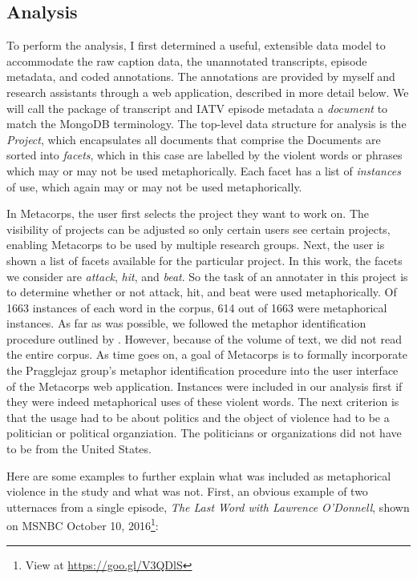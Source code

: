 \subsection{Analysis}
\label{sub:Analysis}

To perform the analysis, I first determined a useful, extensible data model to
accommodate the raw caption data, the unannotated transcripts, episode metadata,
and coded annotations. The annotations are provided by myself and research assistants
through a web application, described in more detail below. We will call the
package of transcript and IATV episode metadata a \textit{document} to match the 
MongoDB terminology. The top-level data structure for analysis is the \textit{Project},
which encapsulates all documents that comprise the 
Documents are sorted into \textit{facets}, which in this case are labelled by the 
violent words or phrases which may or may not be used metaphorically. Each 
facet has a list of \textit{instances} of use, which again may or may not be
used metaphorically. 

In Metacorps, the user first selects the project they want to work on. The
visibility of projects can be adjusted so only certain users see certain projects,
enabling Metacorps to be used by multiple research groups. Next, the user
is shown a list of facets available for the particular project. In this work,
the facets we consider are \textit{attack}, \textit{hit}, and \textit{beat}. 
So the task of an annotater in this project is to determine whether or not
attack, hit, and beat were used metaphorically. Of 1663 instances of each word
in the corpus, 614 out of 1663 were metaphorical instances. As far as was 
possible, we followed the metaphor identification procedure outlined by 
. However, because of the volume of text, we did not
read the entire corpus. As time goes on, a goal of Metacorps is to formally
incorporate the Pragglejaz group's metaphor identification procedure into the
user interface of the Metacorps web application. Instances were included in our
analysis first if they were indeed metaphorical uses of these violent words.
The next criterion is that the usage had to be about politics and the object
of violence had to be a politician or political organziation. The politicians
or organizations did not have to be from the United States. 

Here are some examples to further explain what was included as metaphorical
violence in the study and what was not. First, an obvious example of two 
utternaces from a single episode, \textit{The Last Word with Lawrence O'Donnell},
shown on MSNBC October 10, 2016\footnote{View at \url{https://goo.gl/V3QDlS}}:

